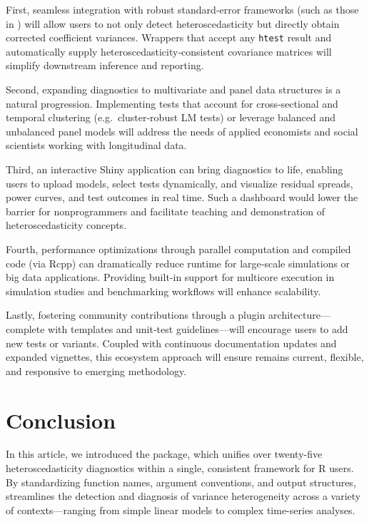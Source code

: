 First, seamless integration with robust standard‐error frameworks (such as those in ) will allow users to not only detect heteroscedasticity but directly obtain corrected coefficient variances. Wrappers that accept any \texttt{htest} result and automatically supply heteroscedasticity‐consistent covariance matrices will simplify downstream inference and reporting.

Second, expanding diagnostics to multivariate and panel data structures is a natural progression. Implementing tests that account for cross‐sectional and temporal clustering (e.g.\ cluster‐robust LM tests) or leverage balanced and unbalanced panel models will address the needs of applied economists and social scientists working with longitudinal data.

Third, an interactive Shiny application can bring diagnostics to life, enabling users to upload models, select tests dynamically, and visualize residual spreads, power curves, and test outcomes in real time. Such a dashboard would lower the barrier for nonprogrammers and facilitate teaching and demonstration of heteroscedasticity concepts.

Fourth, performance optimizations through parallel computation and compiled code (via Rcpp) can dramatically reduce runtime for large‐scale simulations or big data applications. Providing built‐in support for multicore execution in simulation studies and benchmarking workflows will enhance scalability.

Lastly, fostering community contributions through a plugin architecture—complete with templates and unit‐test guidelines—will encourage users to add new tests or variants. Coupled with continuous documentation updates and expanded vignettes, this ecosystem approach will ensure  remains current, flexible, and responsive to emerging methodology.


\section{Conclusion}\label{sec:conclusion}
In this article, we introduced the  package, which unifies over twenty-five heteroscedasticity diagnostics within a single, consistent framework for R users. By standardizing function names, argument conventions, and output structures,  streamlines the detection and diagnosis of variance heterogeneity across a variety of contexts—ranging from simple linear models to complex time-series analyses.

